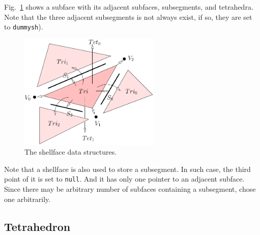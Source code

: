 Fig.~\ref{fig:shellface} shows a subface with its adjacent subfaces, subsegments, and tetrahedra. Note that the three adjacent subsegments is not always exist, if so, they are set to {\tt dummysh}). 

\begin{figure}
  \centering
  \includegraphics[width=0.6\textwidth]{../figs/triang-edge-ds}
\caption{The shellface data structures.}
\label{fig:shellface}
\end{figure}

Note that a shellface is also used to store a subsegment. In such case, the third point of it is set to {\tt null}. And it has only one pointer to an adjacent subface.  Since there may be arbitrary number of subfaces containing a subsegment, chose one arbitrarily.

\subsection{Tetrahedron}

